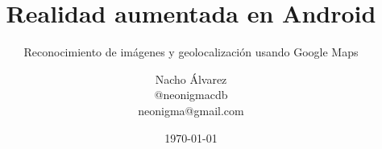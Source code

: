 \documentclass{beamer}
\begin{document}
\title{Realidad aumentada en Android}
\subtitle{Reconocimiento de imágenes y geolocalización usando Google Maps}
\author[Nacho Álvarez]{\texorpdfstring{Nacho Álvarez
  \\ \faTwitter \hspace{5pt}@neonigmacdb
  \\ \faEnvelope \hspace{5pt}neonigma@gmail.com}{Author}}

\date{\today}




\section[Índice]{}
\frame{\tableofcontents}







\end{document}
